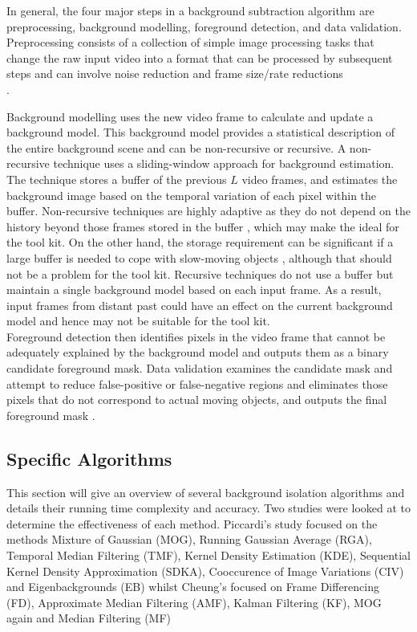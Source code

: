 In general, the four major steps in a background subtraction algorithm are preprocessing, background modelling, foreground detection, and data validation.
Preprocessing consists of a collection of simple image processing tasks that change the raw input video into a format that can be processed by subsequent steps and can involve noise reduction and frame size/rate reductions \cite{Cheung2007}\\.

Background modelling uses the new video frame to calculate and update a background model.
This background model provides a statistical description of the entire background scene and can be non-recursive or recursive. 
A non-recursive technique uses a sliding-window approach for background estimation. 
The technique stores a buffer of the previous $L$ video frames, and estimates the background image based on the temporal variation of each pixel within the buffer.
Non-recursive techniques are highly adaptive as they do not depend on the history beyond those frames stored in the buffer \cite{Cheung2007}, which may make the ideal for the tool kit.
On the other hand, the storage requirement can be significant if a large buffer
is needed to cope with slow-moving objects \cite{Cheung2007}, although that should not be a problem for the tool kit. Recursive techniques do not use a buffer but maintain a single background model based on each input frame. As a result, input frames from distant past could have an effect on the current background model \cite{Cheung2007} and hence may not be suitable for the tool kit.\\

Foreground detection then identifies pixels in the video frame that cannot be adequately explained by the background model and outputs them as a binary candidate foreground mask. 
Data validation examines the candidate mask and attempt to reduce false-positive or false-negative regions and eliminates those pixels that do not correspond to actual moving objects, and outputs the final foreground mask \cite{Cheung2007}.\\

\subsection{Specific Algorithms}
\label{person_isolation:specific algorithms}
This section will give an overview of several background isolation algorithms and details their running time complexity and accuracy. Two studies were looked at to determine the effectiveness of each method. Piccardi's study \cite{Piccardi2004} focused on the methods Mixture of Gaussian (MOG), Running Gaussian Average (RGA), Temporal Median Filtering (TMF), Kernel Density Estimation (KDE), Sequential Kernel Density Approximation (SDKA), Cooccurence of Image Variations (CIV) and Eigenbackgrounds (EB) whilst Cheung's \cite{Cheung2007} focused on Frame Differencing (FD), Approximate Median Filtering (AMF), Kalman Filtering (KF), MOG again and Median Filtering (MF) \\

